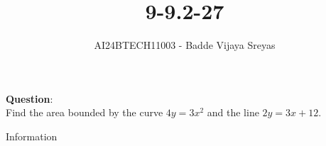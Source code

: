 \documentclass[journal]{IEEEtran}
\begin{document}

\vspace{3cm}

\title{9-9.2-27}
\author{AI24BTECH11003 - Badde Vijaya Sreyas}
{\let\newpage\relax\maketitle}

\renewcommand{\thefigure}{\theenumi}
\renewcommand{\thetable}{\theenumi}
\setlength{\intextsep}{10pt} %


\renewcommand{\thetable}{\theenumi}


\textbf{Question}:\\
Find the area bounded by the curve  $4y=3x^2$ and the line $2y=3x+12$.


\solution
\begin{table}[h!]
	\centering
	
	\caption{Information}
	\label{tab:9-9.2-27}
\end{table}
\end{document}
